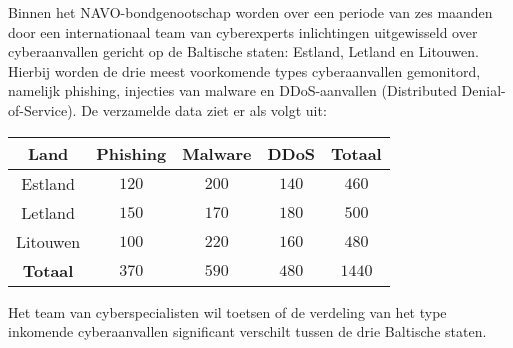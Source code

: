 \begin{question}{20}{
    Binnen het NAVO-bondgenootschap worden over een periode van zes maanden door een internationaal team van cyberexperts inlichtingen uitgewisseld over cyberaanvallen gericht op de Baltische staten: Estland, Letland en Litouwen.
    Hierbij worden de drie meest voorkomende types cyberaanvallen gemonitord, namelijk phishing, injecties van malware en DDoS-aanvallen (Distributed Denial-of-Service).
    De verzamelde data ziet er als volgt uit:

    \begin{center}
        \begin{tabular}{c|ccc|c}
            \toprule
                Land & Phishing & Malware & DDoS & \textbf{Totaal}\\
            \midrule 
                Estland & $120$ & $200$ & $140$ & $460$ \\
                Letland & $150$ & $170$ & $180$ & $500$ \\
                Litouwen & $100$ & $220$ & $160$ & $480$ \\
            \midrule
                \textbf{Totaal} & $370$ & $590$ & $480$ & $1440$ \\
            \bottomrule
        \end{tabular}
    \end{center}
    Het team van cyberspecialisten wil toetsen of de verdeling van het type inkomende cyberaanvallen significant verschilt tussen de drie Baltische staten.
}



\end{question}
